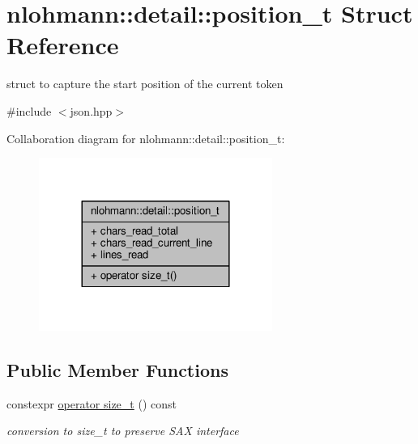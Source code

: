 \hypertarget{structnlohmann_1_1detail_1_1position__t}{}\section{nlohmann\+:\+:detail\+:\+:position\+\_\+t Struct Reference}
\label{structnlohmann_1_1detail_1_1position__t}


struct to capture the start position of the current token  




{\ttfamily \#include $<$json.\+hpp$>$}



Collaboration diagram for nlohmann\+:\+:detail\+:\+:position\+\_\+t\+:
\nopagebreak
\begin{figure}[H]
\begin{center}
\leavevmode
\includegraphics[width=216pt]{structnlohmann_1_1detail_1_1position__t__coll__graph}
\end{center}
\end{figure}
\subsection*{Public Member Functions}
\begin{DoxyCompactItemize}
\item 
constexpr \hyperlink{structnlohmann_1_1detail_1_1position__t_a19ae0c646ae232d805c2480b3c410ffa}{operator size\+\_\+t} () const 
\begin{DoxyCompactList}\small\item\em conversion to size\+\_\+t to preserve S\+AX interface \end{DoxyCompactList}\end{DoxyCompactItemize}
